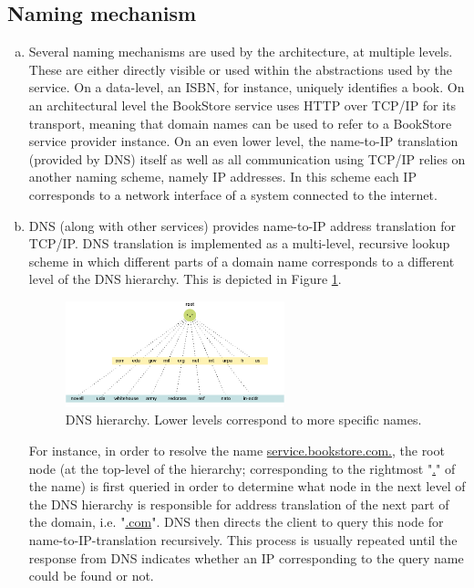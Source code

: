 \documentclass[11pt,a4paper,english]{article}
\begin{document}
\subsection{Naming mechanism}
\begin{enumerate}[(a)]
\item{Several naming mechanisms are used by the architecture, at multiple
    levels. These are either directly visible or used within the abstractions
    used by the service. On a data-level, an ISBN, for instance, uniquely
    identifies a book. On an architectural level the BookStore service uses HTTP
    over TCP/IP for its transport, meaning that domain names can be used to
    refer to a BookStore service provider instance. On an even lower level, the
    name-to-IP translation (provided by DNS) itself as well as all communication
    using TCP/IP relies on another naming scheme, namely IP addresses. In this scheme each IP corresponds to a network interface of a system connected to the internet.}

\item{DNS (along with other services) provides name-to-IP address translation for
    TCP/IP. DNS translation is implemented as a multi-level, recursive lookup scheme in which different parts of a domain name corresponds to a different level of the DNS hierarchy. This is depicted in Figure \ref{fig:dns}.
    
\begin{figure}[!hbt]
    \centering
    \includegraphics[width=0.6\textwidth]{img/dns.png}
    \caption{DNS hierarchy. Lower levels correspond to more specific names.}
    \label{fig:dns}
\end{figure}

For instance, in order to resolve the name \url{service.bookstore.com.}, the root node (at the top-level of the hierarchy; corresponding to the rightmost "\url{.}" of the name) is first queried in order to determine what node in the next level of the DNS hierarchy is responsible for address translation of the next part of the domain, i.e. "\url{.com}". DNS then directs the client to query this node for name-to-IP-translation recursively. This process is usually repeated until the response from DNS indicates whether an IP corresponding to the query name could be found or not.}
\end{enumerate}
\end{document}
